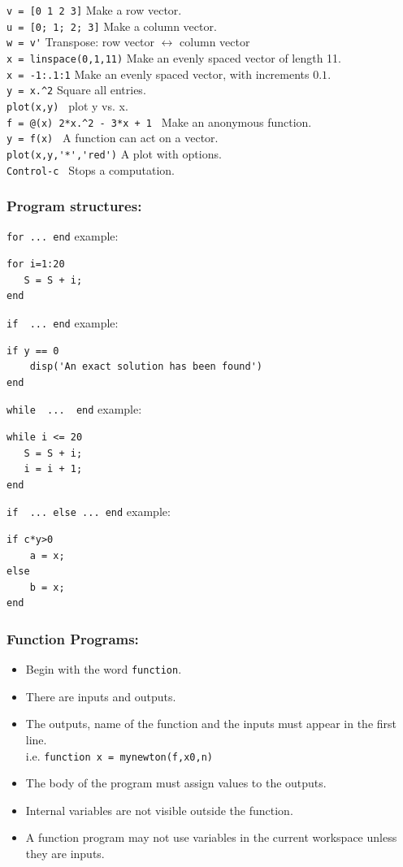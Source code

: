 \verb&v = [0 1 2 3]& \dotfill Make a row vector.\\
\verb&u = [0; 1; 2; 3]& \dotfill Make a column vector.\\
\verb&w = v'& \dotfill Transpose: row vector $\leftrightarrow$ column vector \\
\verb&x = linspace(0,1,11)& \dotfill Make an evenly spaced vector of
                               length 11.\\
\verb&x = -1:.1:1& \dotfill Make an evenly spaced vector, with increments
                               $0.1$.\\
\verb&y = x.^2&  \dotfill Square all entries.\\
\verb&plot(x,y) & \dotfill plot y vs. x.\\
\verb&f = @(x) 2*x.^2 - 3*x + 1 & \dotfill Make an anonymous function.\\
\verb&y = f(x) &  \dotfill A function can act on a vector.\\
\verb&plot(x,y,'*','red')& \dotfill A plot with options.\\
\verb&Control-c & \dotfill Stops a computation.

\subsubsection*{Program structures:}
\verb&for ... end& example:
\begin{lstlisting}
for i=1:20
   S = S + i;
end
\end{lstlisting}
\verb&if  ... end& example:
\begin{lstlisting}
if y == 0
    disp('An exact solution has been found')
end
\end{lstlisting}
\verb&while  ...  end& example:
\begin{lstlisting}
while i <= 20
   S = S + i;
   i = i + 1;
end
\end{lstlisting}
\verb&if  ... else ... end& example:
\begin{lstlisting}
if c*y>0
    a = x;
else
    b = x;
end
\end{lstlisting}


\subsubsection*{Function Programs:}
\begin{itemize}
\item Begin with the word \verb&function&.
\item There are inputs and outputs.
\item The outputs, name of the function and the inputs must appear in the first line.\\
\hspace*{.5cm} i.e. \verb&function x = mynewton(f,x0,n)&
\item The body of the program must assign values to the outputs.
\item Internal variables are not visible outside the function.
\item A function program may not use variables in the current
                  workspace unless they are inputs.
\end{itemize}

